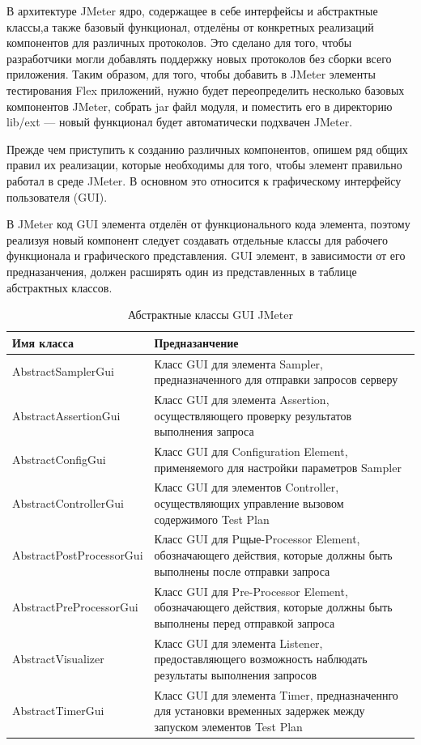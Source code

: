В архитектуре JMeter ядро, содержащее в себе интерфейсы и абстрактные классы,а также базовый функционал,
отделёны от конкретных реализаций компонентов для различных протоколов. Это сделано для того, чтобы разработчики
могли добавлять поддержку новых протоколов без сборки всего приложения. Таким образом, для того, чтобы добавить
в JMeter элементы тестирования Flex приложений, нужно будет переопределить несколько базовых
компонентов JMeter, собрать jar файл модуля, и поместить его в директорию lib/ext --- новый функционал будет
автоматически подхвачен JMeter.

Прежде чем приступить к созданию различных компонентов, опишем ряд общих правил их реализации,
которые необходимы для того, чтобы элемент правильно работал в среде JMeter. В основном это относится к
графическому интерфейсу пользователя (GUI).

В JMeter код GUI элемента отделён от функционального кода элемента, поэтому реализуя новый компонент следует
создавать отдельные классы для рабочего функционала и графического представления. GUI элемент, в зависимости
от его предназанчения, должен расширять один из представленных в таблице абстрактных классов.

\begin{table}[ht]
\caption{Абстрактные классы GUI JMeter}
\begin{tabular}{|p{6cm}|p{9cm}|}
\hline
Имя класса & Предназанчение\\
\hline
AbstractSamplerGui& Класс GUI для элемента Sampler, предназначенного для отправки запросов серверу\\
AbstractAssertionGui& Класс GUI для элемента Assertion, осуществляющего проверку результатов выполнения запроса\\
AbstractConfigGui& Класс GUI для Configuration Element, применяемого для настройки параметров Sampler\\
AbstractControllerGui& Класс GUI для элементов Controller, осуществляющих управление вызовом содержимого Test Plan\\
AbstractPostProcessorGui&Класс GUI для Pщые-Processor Element, обозначающего действия, которые должны быть выполнены
после отправки запроса\\
AbstractPreProcessorGui& Класс GUI для Pre-Processor Element, обозначающего действия, которые должны быть выполнены
перед отправкой запроса\\
AbstractVisualizer& Класс GUI для элемента Listener, предоставляющего возможность наблюдать результаты выполнения
запросов\\
AbstractTimerGui&Класс GUI для элемента Timer, предназначеннго для установки временных задержек между запуском
элементов Test Plan\\
\hline
\end{tabular}
\label{tab:guiJMeter}
\end{table}


